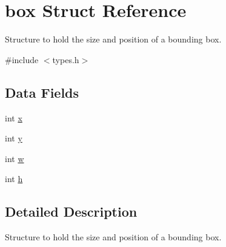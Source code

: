 \hypertarget{structbox}{
\section{box Struct Reference}
\label{structbox}
}


Structure to hold the size and position of a bounding box.  




{\ttfamily \#include $<$types.h$>$}

\subsection*{Data Fields}
\begin{DoxyCompactItemize}
\item 
int \hyperlink{structbox_acf85d53da6b371cb8d0a8fdddf2c64f5}{x}
\item 
int \hyperlink{structbox_af61536fdadb10ddcb4a5a0bda9348525}{y}
\item 
int \hyperlink{structbox_a1367e1dd702ef9e50705487f58b37e24}{w}
\item 
int \hyperlink{structbox_ae5f43093fed8b18ac0522637c943893e}{h}
\end{DoxyCompactItemize}


\subsection{Detailed Description}
Structure to hold the size and position of a bounding box. 

